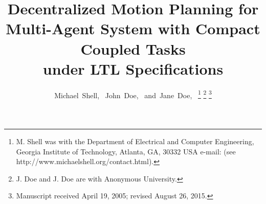 \documentclass[journal]{IEEEtran}
\begin{document}
%
\title{Decentralized Motion Planning for Multi-Agent System with Compact Coupled Tasks \\under LTL Specifications}
%
%
%

\author{Michael~Shell,~
        John~Doe,~
        and~Jane~Doe,~%
\thanks{M. Shell was with the Department
of Electrical and Computer Engineering, Georgia Institute of Technology, Atlanta,
GA, 30332 USA e-mail: (see http://www.michaelshell.org/contact.html).}%
\thanks{J. Doe and J. Doe are with Anonymous University.}%
\thanks{Manuscript received April 19, 2005; revised August 26, 2015.}}

%
%
\end{document}
